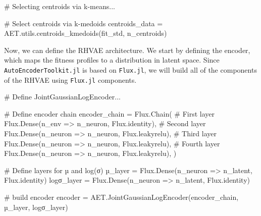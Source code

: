 \documentclass[
]{scrartcl}
\newenvironment{Shaded}{\begin{snugshade}}{\end{snugshade}}
\newcommand{\CommentTok}[1]{\textcolor[rgb]{0.37,0.37,0.37}{#1}}
\newcommand{\FunctionTok}[1]{\textcolor[rgb]{0.28,0.35,0.67}{#1}}
\newcommand{\NormalTok}[1]{\textcolor[rgb]{0.00,0.23,0.31}{#1}}
\newcommand{\OperatorTok}[1]{\textcolor[rgb]{0.37,0.37,0.37}{#1}}
\begin{document}
\begin{Shaded}
\begin{Highlighting}[]
\CommentTok{\# Selecting centroids via k{-}means...}

\CommentTok{\# Select centroids via k{-}medoids}
\NormalTok{centroids\_data }\OperatorTok{=}\NormalTok{ AET.utils.}\FunctionTok{centroids\_kmedoids}\NormalTok{(fit\_std, n\_centroids)}
\end{Highlighting}
\end{Shaded}

Now, we can define the RHVAE architecture. We start by defining the
encoder, which maps the fitness profiles to a distribution in latent
space. Since \texttt{AutoEncoderToolkit.jl} is based on
\texttt{Flux.jl}, we will build all of the components of the RHVAE using
\texttt{Flux.jl} components.

\begin{Shaded}
\begin{Highlighting}[]
\CommentTok{\# Define JointGaussianLogEncoder...}

\CommentTok{\# Define encoder chain}
\NormalTok{encoder\_chain }\OperatorTok{=}\NormalTok{ Flux.}\FunctionTok{Chain}\NormalTok{(}
    \CommentTok{\# First layer}
\NormalTok{    Flux.}\FunctionTok{Dense}\NormalTok{(n\_env }\OperatorTok{=\textgreater{}}\NormalTok{ n\_neuron, Flux.identity),}
    \CommentTok{\# Second layer}
\NormalTok{    Flux.}\FunctionTok{Dense}\NormalTok{(n\_neuron }\OperatorTok{=\textgreater{}}\NormalTok{ n\_neuron, Flux.leakyrelu),}
    \CommentTok{\# Third layer}
\NormalTok{    Flux.}\FunctionTok{Dense}\NormalTok{(n\_neuron }\OperatorTok{=\textgreater{}}\NormalTok{ n\_neuron, Flux.leakyrelu),}
    \CommentTok{\# Fourth layer}
\NormalTok{    Flux.}\FunctionTok{Dense}\NormalTok{(n\_neuron }\OperatorTok{=\textgreater{}}\NormalTok{ n\_neuron, Flux.leakyrelu),}
\NormalTok{)}

\CommentTok{\# Define layers for µ and log(σ)}
\NormalTok{µ\_layer }\OperatorTok{=}\NormalTok{ Flux.}\FunctionTok{Dense}\NormalTok{(n\_neuron }\OperatorTok{=\textgreater{}}\NormalTok{ n\_latent, Flux.identity)}
\NormalTok{logσ\_layer }\OperatorTok{=}\NormalTok{ Flux.}\FunctionTok{Dense}\NormalTok{(n\_neuron }\OperatorTok{=\textgreater{}}\NormalTok{ n\_latent, Flux.identity)}

\CommentTok{\# build encoder}
\NormalTok{encoder }\OperatorTok{=}\NormalTok{ AET.}\FunctionTok{JointGaussianLogEncoder}\NormalTok{(encoder\_chain, µ\_layer, logσ\_layer)}
\end{Highlighting}
\end{Shaded}
\end{document}
